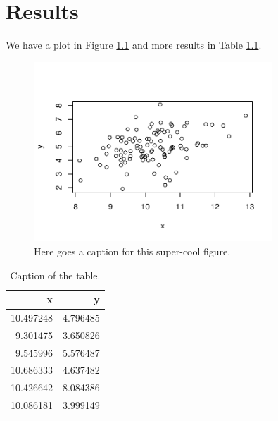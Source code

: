 
\chapter{Results}\label{results}

We have a plot in Figure \ref{fig:plot} and more results in Table \ref{tab:table}.

\begin{figure}
\centering
\includegraphics[width = 0.8\textwidth]{figures/plot-1}
\caption{Here goes a caption for this super-cool figure.}\label{fig:plot}
\end{figure}

\begin{table}
    \caption{\label{tab:table}Caption of the table.}
    \centering
    \begin{tabular}[t]{rr}
    \toprule
    x & y\\
    \midrule
    10.497248 & 4.796485\\
    9.301475 & 3.650826\\
    9.545996 & 5.576487\\
    10.686333 & 4.637482\\
    10.426642 & 8.084386\\
    10.086181 & 3.999149\\
    \bottomrule
    \end{tabular}
\end{table}
